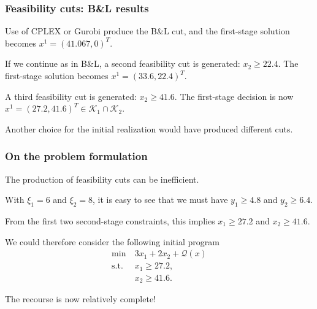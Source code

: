\documentclass{beamer}
\def\cK{\mathcal{K}}
\begin{document}
\begin{frame}
	\frametitle{Feasibility cuts: B\&L results}

Use of CPLEX or Gurobi produce the B\&L cut, and
 the first-stage solution becomes $x^1 = (41.067,0)^T$.
	
	\mbox{}
	
If we continue as in B\&L, a second feasibility cut is generated: $x_2 \geq 22.4$.
The first-stage solution becomes $x^1 = (33.6, 22.4)^T$.
	
	\mbox{}
	
	A third feasibility cut is generated: $x_2 \geq 41.6$.
	The first-stage decision is now $x^1 = (27.2, 41.6)^T \in \cK_1 \cap \cK_2$.
	
	\mbox{}
	
	Another choice for the initial realization would have produced different cuts.
	
\end{frame}

\begin{frame}
	\frametitle{On the problem formulation}
	
	The production of feasibility cuts can be inefficient.
	
	\mbox{}
	
	With $\xi_1 = 6$ and $\xi_2 = 8$, it is easy to see that we must have $y_1 \geq	4.8$ and $y_2 \geq 6.4$.
	
	\mbox{}
	
	From the first two second-stage constraints, this implies $x_1 \geq 27.2$ and $x_2 \geq 41.6$.
	
	\mbox{}
	
	We could therefore consider the following initial program
	\begin{align*}
	\min\ & 3x_1 + 2x_2 + \mathcal{Q}(x) \\
	\mbox{s.t. } & x_1 \geq 27.2, \\
	& x_2 \geq 41.6.
	\end{align*}
	
	The recourse is now relatively complete!
	
\end{frame}
\end{document}
